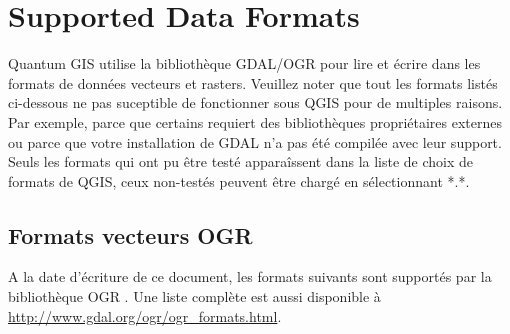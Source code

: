 \section{Supported Data Formats}\label{appdx_data_formats}


Quantum GIS utilise la bibliothèque GDAL/OGR pour lire et écrire dans les formats de données vecteurs et rasters. Veuillez noter que tout les formats listés ci-dessous ne pas suceptible de fonctionner sous QGIS pour de multiples raisons. Par exemple, parce que certains requiert des bibliothèques propriétaires externes ou parce que votre installation de GDAL n'a pas été compilée avec leur support. Seuls les formats qui ont pu être testé apparaîssent dans la liste de choix de formats de QGIS, ceux non-testés peuvent être chargé en sélectionnant *.*.

\subsection{Formats vecteurs OGR}\label{appdx_ogr}

A la date d'écriture de ce document, les formats suivants sont supportés par la bibliothèque OGR \cite{OGRweb}. Une liste complète est aussi disponible à \url{http://www.gdal.org/ogr/ogr_formats.html}.

